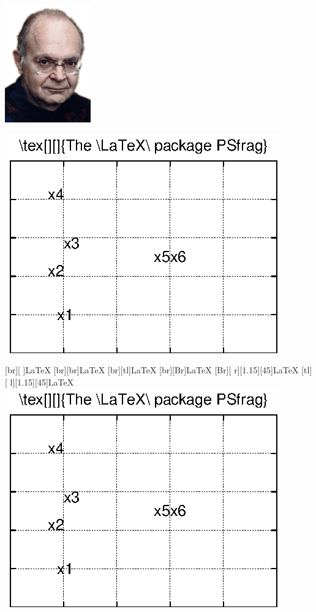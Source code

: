 \documentclass[12pt]{article}
\begin{document}
\vfill

\hfill
{}

\includegraphics[width=.475\textwidth,frame=false,
  namefont={\Huge\itshape}]{knuth}
\hfill
{}%

\vfill

\includegraphics[width=.47\textwidth]{psf-demo}
\hfill
\begin{psfrags}
  \psfragscanon
  [br][  ]{\LaTeX} [br][br]{\LaTeX}
  [br][tl]{\LaTeX} [br][Br]{\LaTeX}
  [Br][ r][1.15][45]{\Huge\LaTeX}
  [tl][ l][1.15][45]{\Huge\LaTeX}
  \includegraphics[width=.47\textwidth]{psf-demo}
\end{psfrags}
\end{document}
